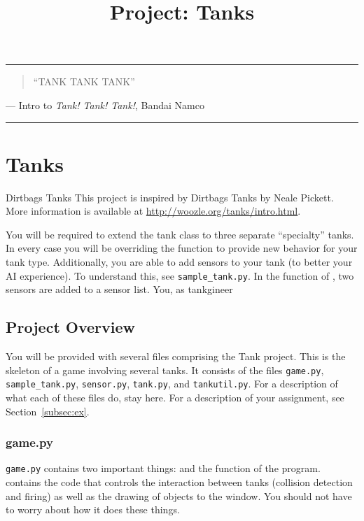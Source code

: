 \documentclass[11pt]{cselabheader}
\title{Project: Tanks}
\begin{document}
\maketitle

\hrule

\begin{quotation}
  ``TANK TANK TANK''
\end{quotation}
\begin{flushright}
  --- Intro to \emph{Tank! Tank! Tank!}, Bandai Namco
\end{flushright}

\hrule


\section{Tanks}

\begin{warningbox}{Dirtbags Tanks}
  This project is inspired by Dirtbags Tanks by Neale Pickett.
  More information is available at \url{http://woozle.org/tanks/intro.html}.
\end{warningbox}

You will be required to extend the tank class to three separate
``specialty'' tanks. In every case you will be overriding the
 function to provide new behavior for your tank
type. Additionally, you are able to add sensors to your tank (to
better your AI experience). To understand this, see
\texttt{sample_tank.py}. In the  function of
, two sensors are added to a sensor list. You, as
tankgineer


\subsection{Project Overview}
You will be provided with several files comprising the Tank project. This is the
skeleton of a game involving several tanks. It consists of the files
\texttt{game.py}, \texttt{sample\_tank.py}, \texttt{sensor.py},
\texttt{tank.py}, and \texttt{tankutil.py}. For a description of what each of
these files do, stay here. For a description of your assignment, see
Section~\ref{subsec:ex}.

\subsubsection{game.py}
\texttt{game.py} contains two important things:  and
the  function of the program. 
contains the code that controls the interaction between tanks (collision
detection and firing) as well as the drawing of objects to the
 window. You should not have to worry about how it does
these things.
\end{document}

